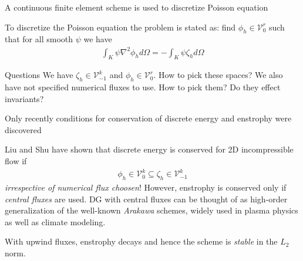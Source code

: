 \documentclass[pdf]{beamer}
\theoremstyle{definition}
\begin{document}
\begin{frame}{A continuous finite element scheme is used to discretize
    Poisson equation}

  To discretize the Poisson equation the problem is stated as: find
  $\phi_h \in \mathcal{V}^r_0$ such that for all smooth $\psi$ we have
  \begin{align*}
    \int_K \psi \nabla^2 \phi_h d\Omega = -\int_K \psi \zeta_h d\Omega
  \end{align*}
  \begin{block}{Questions}
    We have $\zeta_h\in \mathcal{V}^k_{-1}$ and $\phi_h \in
    \mathcal{V}^r_0$. How to pick these spaces? We also have not
    specified numerical fluxes to use. How to pick them? Do they
    effect invariants?
  \end{block}
\end{frame}

\begin{frame}{Only recently conditions for conservation of discrete
    energy and enstrophy were discovered}%

  Liu and Shu have shown that discrete
  energy is conserved for 2D incompressible flow if
  \begin{align*}
    \phi_h \in \mathcal{V}_0^k \subseteq \zeta_h \in \mathcal{V}^k_{-1}
  \end{align*}
  \emph{irrespective of numerical flux choosen}! However, enstrophy is
  conserved only if \emph{central fluxes} are used.  DG with central
  fluxes can be thought of as high-order generalization of the
  well-known \emph{Arakawa} schemes, widely used in plasma physics as
  well as climate modeling.

  With upwind fluxes, enstrophy decays and hence the scheme is
  \emph{stable} in the $L_2$ norm.

\end{frame}
\end{document}
